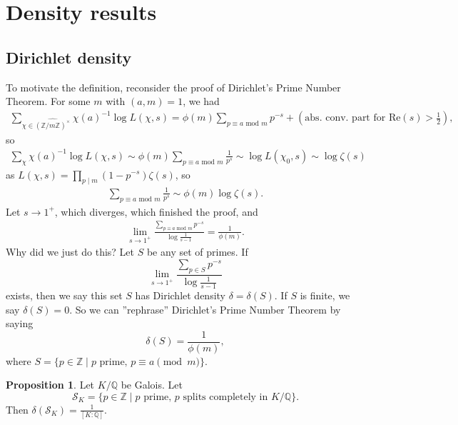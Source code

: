 \documentclass{article}
\theoremstyle{definition}
\newtheorem{prop}[theorem]{Proposition}
\begin{document}
\section{Density results}
\subsection{Dirichlet density}
To motivate the definition, reconsider the proof of Dirichlet's Prime Number Theorem. For some $m$ with $(a,m)=1$, we had 
\begin{align*}
    \sum_{\chi \in \widehat{(\mathbb{Z}/m\mathbb{Z})^\times}}^{}\chi(a)^{-1} \log L(\chi,s) = \phi(m) \sum_{p \equiv a \text{ mod }m}^{} p^{-s} + \left(\text{abs. conv. part for }\text{Re}(s)>\frac{1}{2}\right),
\end{align*}
so
\begin{align*}
    \sum_{\chi}^{} \chi(a)^{-1} \log L(\chi,s) \sim \phi(m) \sum_{p \equiv a \text{ mod } m}^{} \frac{1}{p^s} \sim \log L(\chi_0,s) \sim \log \zeta(s)
\end{align*}
as $L(\chi,s) = \prod_{p \mid m}^{} (1-p^{-s})\zeta(s)$, so
\begin{align*}
    \sum_{ p \equiv  a \text{ mod }m}^{}\frac{1}{p^s} \sim \phi(m) \log \zeta(s). 
\end{align*}
Let $s \to 1^+$, which diverges, which finished the proof, and 
\begin{align*}
    \lim_{s \to 1^+} \frac{\sum_{p \equiv a \text{ mod }m}^{} p^{-s}}{\log \frac{1}{s-1}} = \frac{1}{\phi(m)}.
\end{align*}
Why did we just do this? Let $S$ be any set of primes. If 
\[
\lim_{s \to 1^+} \frac{\sum_{p \in S}^{} p^{-s}}{\log\frac{1}{s-1}}
\]
exists, then we say this set $S$ has Dirichlet density $\delta=\delta(S)$. If $S$ is finite, we say $\delta(S)=0$. So we can ''rephrase'' Dirichlet's Prime Number Theorem by saying
\[
\delta(S) = \frac{1}{\phi(m)},
\]
where $S = \{p \in \mathbb{Z} \mid p \text{ prime, }p \equiv a \pmod{m}\}$.
\begin{prop}\label{prop3.1}
    Let $K/\mathbb{Q}$ be Galois. Let $$\mathcal{S}_K = \{p \in \mathbb{Z} \mid p \text{ prime, }p \text{ splits completely in }K/\mathbb{Q}\}.$$ Then $\delta(\mathcal{S}_K)=\frac{1}{[K:\mathbb{Q}]}$.
\end{prop}
\end{document}
